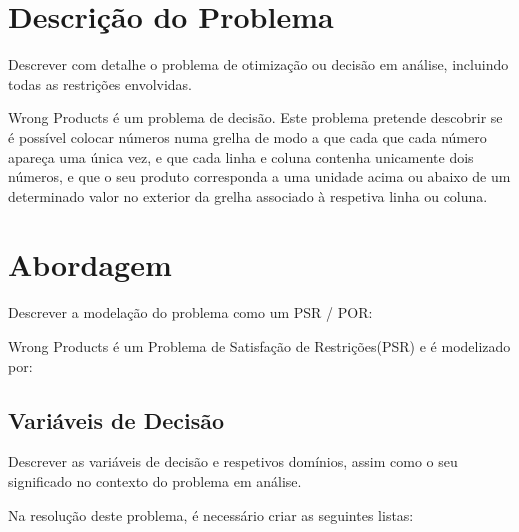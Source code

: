 \documentclass[11pt]{article}
\begin{document}
\section{Descrição do Problema} Descrever com detalhe o problema de
otimização ou decisão em análise, incluindo todas as restrições envolvidas.

Wrong Products é um problema de decisão. Este problema pretende descobrir se é possível colocar números numa grelha de modo a que cada que cada número apareça uma única vez, e que cada linha e coluna contenha unicamente dois números, e que o seu produto corresponda a uma unidade acima ou abaixo de um determinado valor no exterior da grelha associado à respetiva linha ou coluna.


\section{Abordagem} Descrever a modelação do problema como um PSR / POR:

Wrong Products é um Problema de Satisfação de Restrições(PSR) e é modelizado por:

\subsection{Variáveis de Decisão} Descrever as variáveis de decisão e
respetivos domínios, assim como o seu significado no contexto do problema em análise.

Na resolução deste problema, é necessário criar as seguintes listas:
\end{document}
